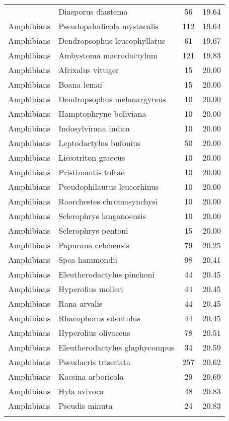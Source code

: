 \begin{longtable}{llcc}
{  Amphibians & Diasporus diastema &  56 & 19.64 \\ 
  Amphibians & Pseudopaludicola mystacalis & 112 & 19.64 \\ 
  Amphibians & Dendropsophus leucophyllatus &  61 & 19.67 \\ 
  Amphibians & Ambystoma macrodactylum & 121 & 19.83 \\ 
  Amphibians & Afrixalus vittiger &  15 & 20.00 \\ 
  Amphibians & Boana lemai &  15 & 20.00 \\ 
  Amphibians & Dendropsophus melanargyreus &  10 & 20.00 \\ 
  Amphibians & Hamptophryne boliviana &  10 & 20.00 \\ 
  Amphibians & Indosylvirana indica &  10 & 20.00 \\ 
  Amphibians & Leptodactylus bufonius &  50 & 20.00 \\ 
  Amphibians & Lissotriton graecus &  10 & 20.00 \\ 
  Amphibians & Pristimantis toftae &  10 & 20.00 \\ 
  Amphibians & Pseudophilautus leucorhinus &  10 & 20.00 \\ 
  Amphibians & Raorchestes chromasynchysi &  10 & 20.00 \\ 
  Amphibians & Sclerophrys langanoensis &  10 & 20.00 \\ 
  Amphibians & Sclerophrys pentoni &  15 & 20.00 \\ 
  Amphibians & Papurana celebensis &  79 & 20.25 \\ 
  Amphibians & Spea hammondii &  98 & 20.41 \\ 
  Amphibians & Eleutherodactylus pinchoni &  44 & 20.45 \\ 
  Amphibians & Hyperolius molleri &  44 & 20.45 \\ 
  Amphibians & Rana arvalis &  44 & 20.45 \\ 
  Amphibians & Rhacophorus edentulus &  44 & 20.45 \\ 
  Amphibians & Hyperolius olivaceus &  78 & 20.51 \\ 
  Amphibians & Eleutherodactylus glaphycompus &  34 & 20.59 \\ 
  Amphibians & Pseudacris triseriata & 257 & 20.62 \\ 
  Amphibians & Kassina arboricola &  29 & 20.69 \\ 
  Amphibians & Hyla avivoca &  48 & 20.83 \\ 
  Amphibians & Pseudis minuta &  24 & 20.83 \\ 
}
\end{longtable}

